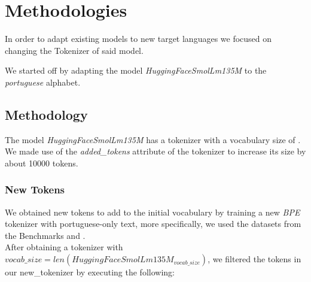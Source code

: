 
\chapter{Methodologies}


\label{Section5}

In order to adapt existing models to new target languages we focused on changing the Tokenizer of said model.

We started off by adapting the model \textit{HuggingFaceSmolLm135M} to the \textit{portuguese} alphabet.

\section{Methodology}
The model \textit{HuggingFaceSmolLm135M} has a tokenizer with a vocabulary size of .
We made use of the \textit{added_tokens} attribute of the tokenizer to increase its size by about 10000 tokens.

\subsection{New Tokens}
We obtained new tokens to add to the initial vocabulary by training a new \textit{BPE} tokenizer with portuguese-only text, 
more specifically, we used the datasets from the Benchmarks  and .\\

After obtaining a tokenizer with $vocab\_size=len(HuggingFaceSmolLm135M_{vocab\_size})$, we filtered the tokens in our 
new_tokenizer by executing the following:

